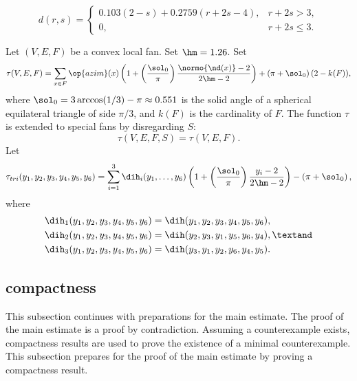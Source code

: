 \begin{definition}[d]\label{def:d}
\[
d(r,s) = \begin{cases}
0.103 (2-s) + 0.2759 (r+2s-4), & r + 2s > 3,\\
0, & r + 2s \le 3.
\end{cases}
\]
\end{definition}

\begin{definition}\label{def:tau}
Let $(V,E,F)$ be a convex local fan.  Set $\hm = 1.26$.  Set
\[ 
  \tau(V,E,F) =\sum_{x\in F} \op{azim}(x)\left(1 + \left(\dfrac{\sol_0}{\pi}  \right)
    \dfrac{\normo{\nd(x)}-2}{2\hm-2}\right) 
+ \left(\pi+{\sol_0}\right) (2- k(F)),
\] 
where $\sol_0=3\arccos(1/3)-\pi\approx0.551$ is the solid angle of a
spherical equilateral triangle of side $\pi/3$, and $k(F)$ is the
cardinality of $F$.  The function $\tau$ is extended to special fans by
disregarding $S$:
\[ 
\tau(V,E,F,S) = \tau(V,E,F).
\] 
Let 
\[ 
  \tau_{tri}(y_1,y_2,y_3,y_4,y_5,y_6) =
  \sum_{i=1}^3 \dih_i(y_1,\ldots,y_6)
\left(1 + \left(\dfrac{\sol_0}{\pi}  \right)\dfrac{y_i -2}{2\hm-2}\right) 
- \left(\pi+{\sol_0}\right),
\] 
where
\begin{align}\label{eqn:dihi}
\dih_1(y_1,y_2,y_3,y_4,y_5,y_6) &= \dih(y_1,y_2,y_3,y_4,y_5,y_6),\notag\\
\dih_2(y_1,y_2,y_3,y_4,y_5,y_6) &= \dih(y_2,y_3,y_1,y_5,y_6,y_4),\textand\notag \\
\dih_3(y_1,y_2,y_3,y_4,y_5,y_6) &= \dih(y_3,y_1,y_2,y_6,y_4,y_5).
\end{align}
\end{definition}



\subsection{compactness}

This subsection continues with preparations for the main estimate.
The proof of the main estimate is a proof by contradiction. Assuming a
counterexample exists, compactness results are used to prove the
existence of a minimal counterexample.  This subsection prepares for
the proof of the main estimate by proving a compactness result.

